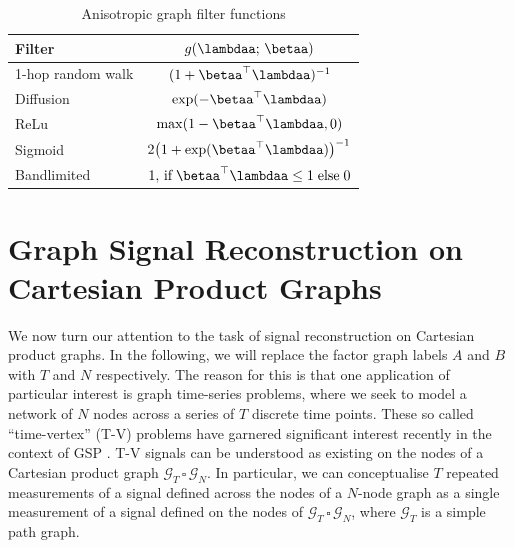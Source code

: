 \begin{table}[t]
    \def\arraystretch{1.7}
    \small
    \begin{center}
    \begin{tabular}{|l|c|}
    \hline
    \textbf{Filter}   & $g(\lambdaa; \,\betaa)$    \\ 
    \hline
    1-hop random walk & $(1 + \betaa^\top\lambdaa)^{-1}$ \\
    \hline
    Diffusion         & $\exp(-\betaa^\top\lambdaa)$       \\
    \hline
    ReLu              & $\max (1 - \betaa^\top\lambdaa, 0)$  \\
    \hline
    Sigmoid           & $2 \big( 1 + \exp(\betaa^\top\lambdaa)\big)^{-1}$ \\
    \hline
    Bandlimited       & $1, \,\text{if} \; \betaa^\top\lambdaa \leq 1 \; \text{else} \; 0$   \\
    \hline
    \end{tabular}
    \end{center}
    \caption{Anisotropic graph filter functions}
    \label{tab:anis_filters}
    \end{table}



\section{Graph Signal Reconstruction on Cartesian Product Graphs}

\label{sec:gsr_cpg}

We now turn our attention to the task of signal reconstruction on Cartesian product graphs. In the following, we will replace the factor graph labels $A$ and $B$ with $T$ and $N$ respectively. The reason for this is that one application of particular interest is graph time-series problems, where we seek to model a network of $N$ nodes across a series of $T$ discrete time points. These so called ``time-vertex'' (T-V) problems have garnered significant interest recently in the context of GSP \citep{Grassi2018, Isufi2017, Loukas2016}. T-V signals can be understood as existing on the nodes of a Cartesian product graph $\mathcal{G}_T \, \square \, \mathcal{G}_N$. In particular, we can conceptualise $T$ repeated measurements of a signal defined across the nodes of a $N$-node graph as a single measurement of a signal defined on the nodes of $\mathcal{G}_T \, \square \, \mathcal{G}_N$, where $\mathcal{G}_T$ is a simple path graph.

\vspace{1cm}


